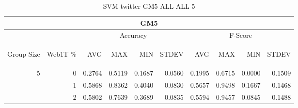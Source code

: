 \begin{center}
\begin{table}[htbp] 
 \begin{center}
\begin{tabular}{ | r | r | r | r | r | r | r | r | r | r |}
\hline
\multicolumn{10}{|c|}{GM5}\\
\hline
 & & \multicolumn{4}{|c|}{Accuracy} & \multicolumn{4}{|c|}{F-Score}\\ \cline{3-10}
\begin{sideways}Group Size\end{sideways} & \begin{sideways}Web1T \%\end{sideways} & \begin{sideways}AVG\end{sideways} & \begin{sideways}MAX\end{sideways} & \begin{sideways}MIN\end{sideways} & \begin{sideways}STDEV\end{sideways} & \begin{sideways}AVG\end{sideways} & \begin{sideways}MAX\end{sideways} & \begin{sideways}MIN\end{sideways} & \begin{sideways}STDEV\end{sideways}\\
\hline
\multirow{2}{*}{5}
 & 0 & 0.2764 & 0.5119 & 0.1687 & 0.0560 & 0.1995 & 0.6715 & 0.0000 & 0.1509\\ \cline{2-10}
 & 1 & 0.5868 & 0.8362 & 0.4040 & 0.0830 & 0.5657 & 0.9498 & 0.1667 & 0.1468\\ \cline{2-10}
 & 2 & 0.5802 & 0.7639 & 0.3689 & 0.0835 & 0.5594 & 0.9457 & 0.0845 & 0.1488\\ \cline{2-10}
\hline
\end{tabular}
\caption{SVM-twitter-GM5-ALL-ALL-5}
\label{table:SVM-twitter-GM5-ALL-ALL-5}
\end{center}
 \end{table}
\end{center}

